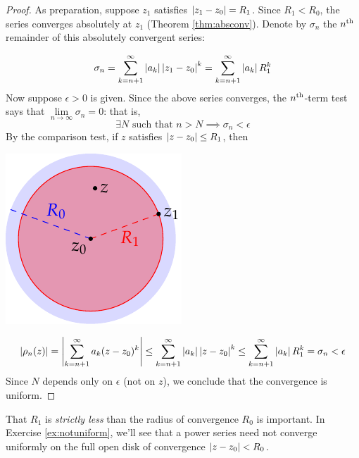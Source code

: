 \begin{proof}
	As preparation, suppose $z_1$ satisfies $\left| z_1-z_0\right|=R_1$. Since $R_1<R_0$, the series converges absolutely at $z_1$ (Theorem \ref{thm:absconv}). Denote by $\sigma_n$ the $n\textsuperscript{th}$ remainder of this absolutely convergent series:\par
	\begin{minipage}[t]{0.7\linewidth}\vspace{-8pt}
	\[
		\sigma_n=\sum_{k=n+1}^\infty\left| a_k\right|\left| z_1-z_0\right|^k =\sum_{k=n+1}^\infty\left| a_k\right|R_1^k
	\]
	Now suppose $\epsilon>0$ is given. Since the above series converges, the $n\textsuperscript{th}$-term test says that $\lim\limits_{n\to\infty}\sigma_n=0$: that is,
	\[
		\exists N\text{ such that }n>N\implies \sigma_n<\epsilon
	\]
	By the comparison test, if $z$ satisfies $\left| z-z_0\right|\le R_1$, then
	\end{minipage}
	\hfill
	\begin{minipage}[t]{0.29\linewidth}\vspace{0pt}
		\flushright\includegraphics[scale=0.95]{uniform}
	\end{minipage}\par\vspace{-4pt}
	\[
		\left| \rho_n(z)\right| =\left| \sum_{k=n+1}^\infty a_k(z-z_0)^k\right|
		\le\sum_{k=n+1}^\infty\left| a_k\right|\left| z-z_0\right|^k 
		\le\sum_{k=n+1}^\infty\left| a_k\right|R_1^k
		=\sigma_n <\epsilon
	\]
	Since $N$ depends only on $\epsilon$ (not on $z$), we conclude that the convergence is uniform.\footnotemark
\end{proof}


That $R_1$ is \emph{strictly less} than the radius of convergence $R_0$ is important. In Exercise \ref{ex:notuniform}, we'll see that a power series need not converge uniformly on the full open disk of convergence $\left| z-z_0\right|<R_0$.


